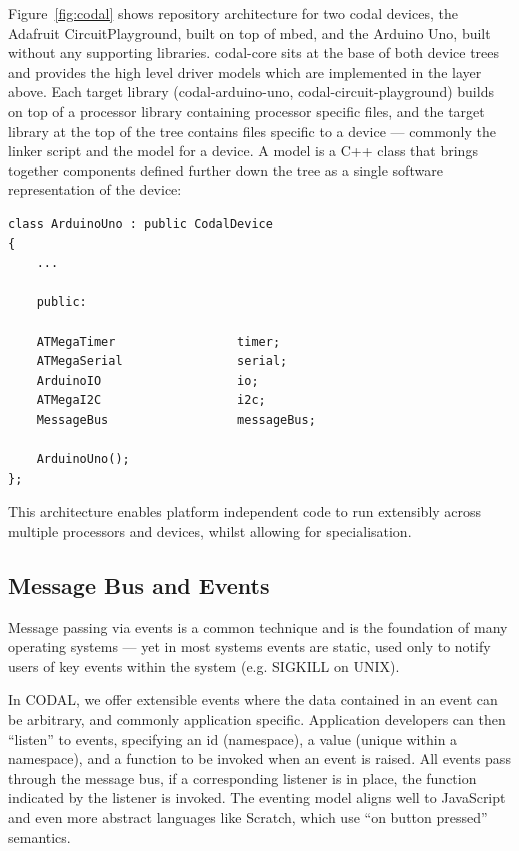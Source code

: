 Figure~\ref{fig:codal} shows repository architecture for two codal devices, the Adafruit CircuitPlayground, built on top of mbed, and the Arduino Uno, built without any supporting libraries. codal-core sits at the base of both device trees and provides the high level driver models which are implemented in the layer above. Each target library (codal-arduino-uno, codal-circuit-playground) builds on top of a processor library containing processor specific files, and the target library at the top of the tree contains files specific to a device --- commonly the linker script and the model for a device. A model is a C++ class that brings together components defined further down the tree as a single software representation of the device:

\begin{lstlisting}
class ArduinoUno : public CodalDevice
{
    ...

    public:

    ATMegaTimer                 timer;
    ATMegaSerial                serial;
    ArduinoIO                   io;
    ATMegaI2C                   i2c;
    MessageBus                  messageBus;

    ArduinoUno();
};
\end{lstlisting}

This architecture enables platform independent code to run extensibly across multiple processors and devices, whilst allowing for specialisation.

\subsection{Message Bus and Events}

Message passing via events is a common technique and is the foundation of many operating systems --- yet in most systems events are static, used only to notify users of key events within the system (e.g. SIGKILL on UNIX).

In CODAL, we offer extensible events where the data contained in an event can be arbitrary, and commonly application specific. Application developers can then ``listen'' to events, specifying an id (namespace), a value (unique within a namespace), and a function to be invoked when an event is raised. All events pass through the message bus, if a corresponding listener is in place, the function indicated by the listener is invoked. The eventing model aligns well to JavaScript and even more abstract languages like Scratch, which use ``on button pressed'' semantics.

